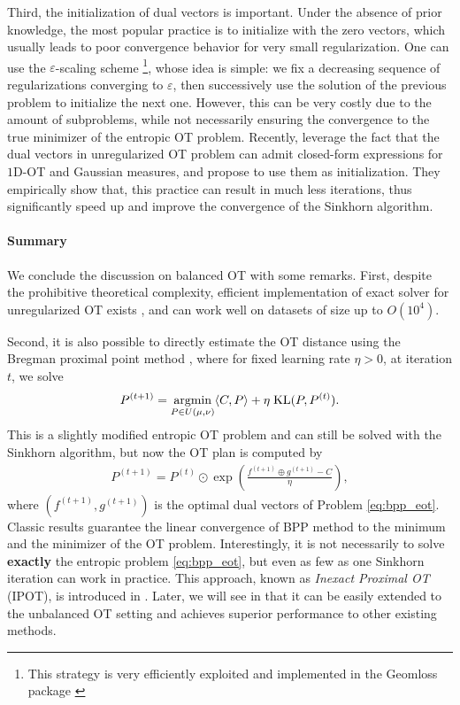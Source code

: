 Third, the initialization of dual vectors is important.
Under the absence of prior knowledge, the most popular practice is to initialize with
the zero vectors, which usually leads to poor convergence behavior for very small regularization.
One can use the $\varepsilon$-scaling scheme \citep{Schmitzer19}
\footnote{This strategy is very efficiently exploited and implemented in the Geomloss package
\citep{Feydy19}}, whose idea is simple: we fix a decreasing sequence of regularizations
converging to $\varepsilon$, then successively use the solution of the previous problem to
initialize the next one. However, this can be very costly due to the amount of subproblems,
while not necessarily ensuring the convergence to the true minimizer of the entropic OT problem.
Recently, \citep{Thornton23a} leverage the fact that the dual vectors in unregularized OT problem
can admit closed-form expressions for $1$D-OT and Gaussian measures, and propose to use them
as initialization. They empirically show that, this practice can result in much less iterations,
thus significantly speed up and improve the convergence of the Sinkhorn algorithm.

\paragraph{Summary} \label{para:summary}
We conclude the discussion on balanced OT with some remarks.
First, despite the prohibitive theoretical complexity,
efficient implementation of exact solver for unregularized OT exists \citep{Flamary21},
and can work well on datasets of size up to $O(10^4)$.

Second, it is also possible to directly estimate the OT distance using the
Bregman proximal point method \citep{Chen93,Teboulle97}, where for fixed learning rate $\eta > 0$,
at iteration $t$, we solve
\begin{align}
  \label{eq:bpp_eot}
  P^{(t+1)} = \operatorname*{argmin}_{P \in U(\mu, \nu)} \langle C, P \rangle + \eta \; \text{KL}(P, P^{(t)}).
\end{align}
This is a slightly modified entropic OT problem and can still be solved with the
Sinkhorn algorithm, but now the OT plan is computed by
\begin{align}
  P^{(t+1)} = P^{(t)} \odot \exp \left( \frac{f^{(t+1)} \oplus g^{(t+1)} - C}{\eta} \right),
\end{align}
where $(f^{(t+1)}, g^{(t+1)})$ is the optimal dual vectors of Problem \eqref{eq:bpp_eot}.
Classic results \citep{Chen93} guarantee the linear convergence of BPP method
to the minimum and the minimizer of the OT problem.
Interestingly, it is not necessarily to solve \textbf{exactly} the entropic problem \eqref{eq:bpp_eot},
but even as few as one Sinkhorn iteration can work in practice.
This approach, known as \textit{Inexact Proximal OT} (IPOT), is introduced in \citep{Xie20}.
Later, we will see in  that it can be easily extended to the unbalanced OT setting
and achieves superior performance to other existing methods.

